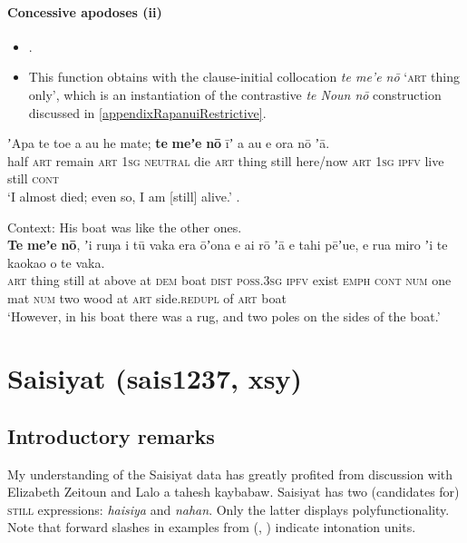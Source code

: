 \paragraph{Concessive apodoses (ii)}
\label{appendixRapaNuiConcessiveConsequent2}
\begin{itemize}
	\item  \textcite[570]{Kieviet2017}.
	\item This function obtains with the clause-initial collocation \textit{te me'e nō} \lq \textsc{art} thing only', which is an instantiation of the contrastive \textit{te Noun nō} construction discussed in \ref{appendixRapanuiRestrictive}.
\end{itemize}	
\begin{exe}
	\ex \label{exAppendixRapaNuiConcessiveQ3}
	\gll ʼApa te toe a au he mate; \textbf{te} \textbf{meʼe} \textbf{nō} īʼ a au e ora nō ʼā.\\
	half \textsc{art} remain \textsc{art} 1\textsc{sg} \textsc{neutral} die \textsc{art} thing still here/now \textsc{art}  1\textsc{sg} \textsc{ipfv} live still \textsc{cont}\\
	\glt \lq I almost died; even so, I am [still] alive.' \parencite[570]{Kieviet2017}.
		
	\ex \label{exAppendixRapaNuiConcessiveQ4}
	Context: His boat was like the other ones.\\
	\gll \textbf{Te} \textbf{meʼe} \textbf{nō}, ʼi ruŋa i tū vaka era ōʼona e ai rō ʼā e tahi pēʼue, e rua miro ʼi te kaokao o te vaka.\\
\textsc{art} thing still at above at \textsc{dem} boat \textsc{dist} \textsc{poss}.3\textsc{sg} \textsc{ipfv} exist \textsc{emph} \textsc{cont} \textsc{num} one mat \textsc{num} two wood at \textsc{art} side.\textsc{redupl} of \textsc{art} boat\\
\glt \lq However, in his boat there was a rug, and two poles on the sides of the boat.' \parencite[268]{Kieviet2017}
\end{exe}

\section{Saisiyat (sais1237, xsy)}
\label{appendixSaisiyat}
\subsection{Introductory remarks}
My understanding of the Saisiyat data has greatly profited from discussion with Elizabeth Zeitoun and Lalo a tahesh kaybabaw. Saisiyat has two (candidates for) \textsc{still} expressions: \textit{haisiya} and \textit{nahan}. Only the latter displays polyfunctionality. Note that forward slashes in examples from \citeauthor{Huang2007} (\citeyear{Huang2007}, \citeyear{Huang2008}) indicate intonation units.

